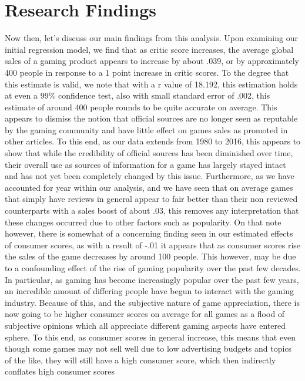 \documentclass[12pt,english]{article}
\begin{document}
\section{Research Findings}\label{sec:results}
Now then, let’s discuss our main findings from this analysis. Upon examining our initial 
regression model, we find that as critic score increases, the average global sales of a gaming 
product appears to increase by about .039, or by approximately 400 people in response to a 1 
point increase in critic scores. To the degree that this estimate is valid, we note that with a r value 
of 18.192, this estimation holds at even a 99\% confidence test, also with small standard error of 
.002, this estimate of around 400 people rounds to be quite accurate on average. This appears to 
dismiss the notion that official sources are no longer seen as reputable by the gaming community 
and have little effect on games sales as promoted in other articles. To this end, as our data 
extends from 1980 to 2016, this appears to show that while the credibility of official sources has 
been diminished over time, their overall use as sources of information for a game has largely 
stayed intact and has not yet been completely changed by this issue. Furthermore, as we have 
accounted for year within our analysis, and we have seen that on average games that simply have 
reviews in general appear to fair better than their non reviewed counterparts with a sales boost of 
about .03, this removes any interpretation that these changes occurred due to other factors such 
as popularity. On that note however, there is somewhat of a concerning finding seen in our 
estimated effects of consumer scores, as with a result of -.01 it appears that as consumer scores 
rise the sales of the game decreases by around 100 people. This however, may be due to a 
confounding effect of the rise of gaming popularity over the past few decades. In particular, as 
gaming has become increasingly popular over the past few years, an incredible amount of 
differing people have begun to interact with the gaming industry. Because of this, and the 
subjective nature of game appreciation, there is now going to be higher consumer scores on 
average for all games as a flood of subjective opinions which all appreciate different gaming 
aspects have entered sphere. To this end, as consumer scores in general increase, this means that 
even though some games may not sell well due to low advertising budgets and topics of the like, 
they will still have a high consumer score, which then indirectly conflates high consumer scores 
\end{document}
